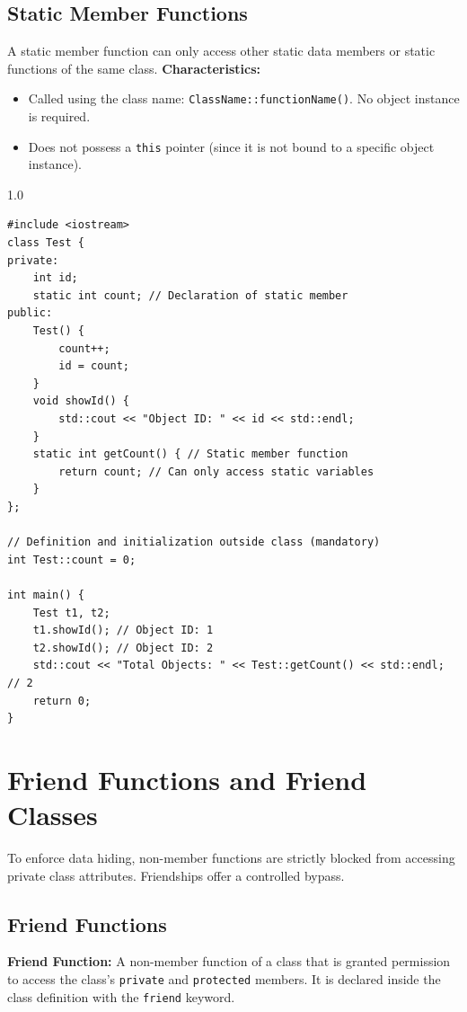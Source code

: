 \documentclass[12pt,a4paper]{article}
\begin{document}
\subsection{Static Member Functions}
A static member function can only access other static data members or static functions of the same class.
\textbf{Characteristics:}
\begin{itemize}[leftmargin=*, itemsep=2pt]
  \item Called using the class name: \texttt{ClassName::functionName()}. No object instance is required.
  \item Does not possess a \texttt{this} pointer (since it is not bound to a specific object instance).
\end{itemize}

\begin{tcolorbox}[examplebox, title={Code Example: Tracking Object Counts using Static Members}]
\begin{spacing}{1.0}
\begin{verbatim}
#include <iostream>
class Test {
private:
    int id;
    static int count; // Declaration of static member
public:
    Test() {
        count++;
        id = count;
    }
    void showId() {
        std::cout << "Object ID: " << id << std::endl;
    }
    static int getCount() { // Static member function
        return count; // Can only access static variables
    }
};

// Definition and initialization outside class (mandatory)
int Test::count = 0;

int main() {
    Test t1, t2;
    t1.showId(); // Object ID: 1
    t2.showId(); // Object ID: 2
    std::cout << "Total Objects: " << Test::getCount() << std::endl; // 2
    return 0;
}
\end{verbatim}
\end{spacing}
\end{tcolorbox}

\section{Friend Functions and Friend Classes}

To enforce data hiding, non-member functions are strictly blocked from accessing private class attributes. Friendships offer a controlled bypass.

\subsection{Friend Functions}
\begin{tcolorbox}[defbox]
\textbf{Friend Function:} A non-member function of a class that is granted permission to access the class's \texttt{private} and \texttt{protected} members. It is declared inside the class definition with the \texttt{friend} keyword.
\end{tcolorbox}
\end{document}
